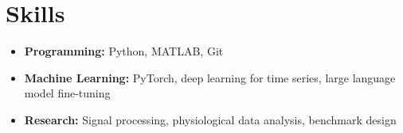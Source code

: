 \documentclass[10pt,a4paper]{article}
\begin{document}
\section{Skills}
\begin{itemize}
  \item \textbf{Programming:} Python, MATLAB, Git
  \item \textbf{Machine Learning:} PyTorch, deep learning for time series, large language model fine-tuning
  \item \textbf{Research:} Signal processing, physiological data analysis, benchmark design
\end{itemize}
\end{document}
